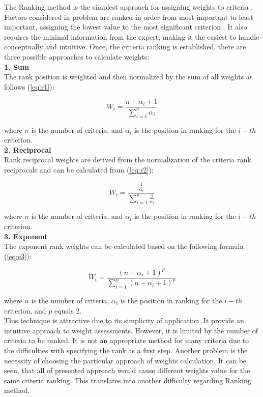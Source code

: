 The Ranking method is the simplest approach for assigning weights to criteria \cite{odu2019weighting}. Factors considered in problem are ranked in order from most important to least important, assigning the lowest value to the most significant criterion \cite{roszkowska2013rank}. It also requires the minimal information from the expert, making it the easiest to handle conceptually and intuitive. Once, the criteria ranking is established, there are three possible approaches to calculate weights: \\

\noindent \textbf{1. Sum} \\

The rank position is weighted and then normalized by the sum of all weights as follows (\ref{eq:r1}):

\begin{equation}
    W_i = \frac{n - \alpha_i + 1}{\sum^{n}_{i=1}\alpha_i}
\label{eq:r1}
\end{equation}

where $n$ is the number of criteria, and $\alpha_i$ is the position in ranking for the $i-th$ criterion. \\

\noindent \textbf{2. Reciprocal} \\

Rank reciprocal weights are derived from the normalization of the criteria rank reciprocals and can be calculated from (\ref{eq:r2}):

\begin{equation}
    W_i = \frac{\frac{1}{\alpha_i}}{\sum^{n}_{i=1} \frac{1}{\alpha_i}}
\label{eq:r2}
\end{equation}

where $n$ is the number of criteria, and $\alpha_i$ is the position in ranking for the $i-th$ criterion. \\

\noindent \textbf{3. Exponent} \\

The exponent rank weights can be calculated based on the following formula (\ref{eq:e3}):

\begin{equation}
    W_i = \frac{(n - \alpha_i + 1)^p}{\sum^{n}_{i=1} (n - \alpha_i + 1)^p}
\label{eq:r3}
\end{equation}

where $n$ is the number of criteria, $\alpha_i$ is the position in ranking for the $i-th$ criterion, and $p$ equals 2. \\

This technique is attractive due to its simplicity of application. It provide an intuitive approach to weight assessments. However, it is limited by the number of criteria to be ranked. It is not an appropriate method for many criteria due to the difficulties with specifying the rank as a first step. Another problem is the necessity of choosing the particular approach of weights calculation. It can be seen, that all of presented approach would cause different weights value for the same criteria ranking. This translates into another difficulty regarding Ranking method.